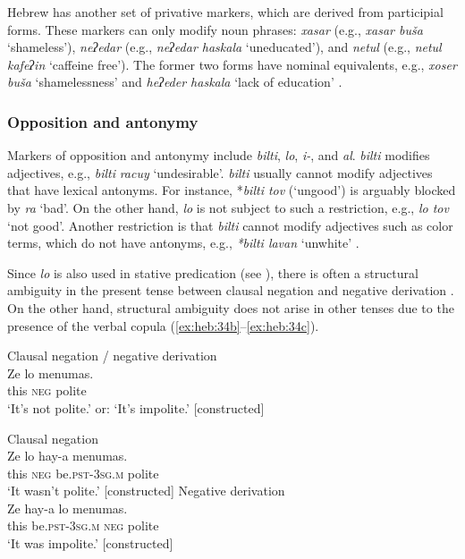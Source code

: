 \documentclass[output=paper,colorlinks,citecolor=brown]{langscibook}
\begin{document}
Hebrew has another set of privative markers, which are derived from participial forms. These markers can only modify noun phrases: \textit{xasar} (e.g., \textit{xasar buša} ‘shameless’), \textit{neʔedar} (e.g., \textit{neʔedar haskala} ‘uneducated’), and \textit{netul} (e.g., \textit{netul} \textit{kafeʔin} ‘caffeine free’). The former two forms have nominal equivalents, e.g., \textit{xoser buša} ‘shamelessness’ and \textit{heʔeder haskala} ‘lack of education’ \citep[55--66, 77--81]{Tzivoni1993}.

\subsubsection{Opposition and antonymy} \label{sec:heb:3.3.2}

Markers of opposition and antonymy include \textit{bilti}, \textit{lo}, \textit{i{}-}, and \textit{al}. \textit{bilti} modifies adjectives, e.g., \textit{bilti} \textit{racuy} ‘undesirable’. \textit{bilti} usually cannot modify adjectives that have lexical antonyms. For instance, *\textit{bilti tov} (‘ungood’) is arguably blocked by \textit{ra} ‘bad’. On the other hand, \textit{lo} is not subject to such a restriction, e.g., \textit{lo tov} ‘not good’. Another restriction is that \textit{bilti} cannot modify adjectives such as color terms, which do not have antonyms, e.g., \textit{*bilti lavan} ‘unwhite’ \citep[31]{Tzivoni1993}.

Since \textit{lo} is also used in stative predication (see ), there is often a structural ambiguity in the present tense between clausal negation and negative derivation . On the other hand, structural ambiguity does not arise in other tenses due to the presence of the verbal copula (\ref{ex:heb:34b}--\ref{ex:heb:34c}).

\ea\label{ex:heb:34a} Clausal negation / negative derivation\\
    \gll Ze lo menumas.\\
        this \textsc{neg} polite\\
    \glt ‘It’s not polite.’ or: ‘It’s impolite.’ [constructed]
\z
    
\ea\label{ex:heb:34}
    \ea\label{ex:heb:34b} Clausal negation\\
        \gll Ze lo hay-a menumas.\\
            this \textsc{neg} be.\textsc{pst-3sg.m} polite\\
        \glt ‘It wasn’t polite.’ [constructed]
    \ex\label{ex:heb:34c} Negative derivation\\
        \gll Ze hay-a lo menumas.\\
             this be.\textsc{pst-3sg.m} \textsc{neg} polite\\
        \glt ‘It was impolite.’ [constructed]
    \z 
\z 
\end{document}
